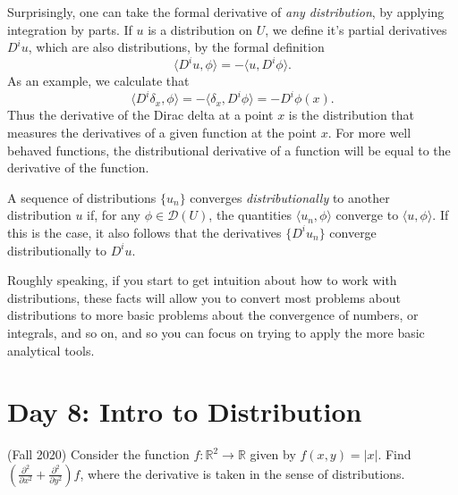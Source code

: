 \documentclass{exam}
\theoremstyle{problemstyle}
\newcommand{\1}[1]{\textbf{1}_{\left[#1\right]}} %
\def\R{\mathbb{R}} %
\begin{document}
\begin{questions}
Surprisingly, one can take the formal derivative of \emph{any distribution}, by applying integration by parts. If $u$ is a distribution on $U$, we define it's partial derivatives $D^i u$, which are also distributions, by the formal definition
%
\[ \langle D^i u, \phi \rangle = - \langle u, D^i \phi \rangle. \]
%
As an example, we calculate that
%
\[ \langle D^i \delta_x, \phi \rangle = - \langle \delta_x, D^i \phi \rangle = - D^i \phi(x). \]
%
Thus the derivative of the Dirac delta at a point $x$ is the distribution that measures the derivatives of a given function at the point $x$. For more well behaved functions, the distributional derivative of a function will be equal to the derivative of the function.

A sequence of distributions $\{ u_n \}$ converges \emph{distributionally} to another distribution $u$ if, for any $\phi \in \mathcal{D}(U)$, the quantities $\langle u_n, \phi \rangle$ converge to $\langle u, \phi \rangle$. If this is the case, it also follows that the derivatives $\{ D^i u_n \}$ converge distributionally to $D^i u$.

Roughly speaking, if you start to get intuition about how to work with distributions, these facts will allow you to convert most problems about distributions to more basic problems about the convergence of numbers, or integrals, and so on, and so you can focus on trying to apply the more basic analytical tools.







\newpage
\section{Day 8: Intro to Distribution}

\item (Fall 2020)
Consider the function $f:\R^{2}\to \R$ given by $f(x,y)=|x|$. Find $\left( \frac{\partial ^{2}}{\partial x^{2}}+ \frac{\partial ^{2}}{\partial y^{2}} \right)f$, where the derivative is taken in the sense of distributions.


\end{questions}
\end{document}
